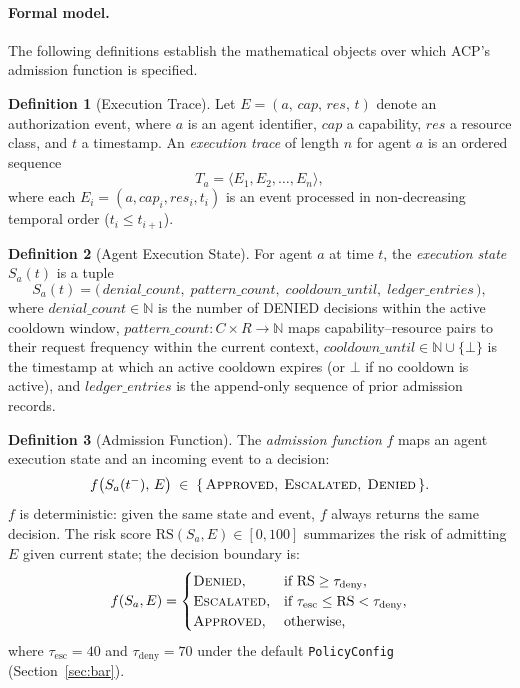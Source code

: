 \documentclass[11pt]{article}
\theoremstyle{definition}
\newtheorem{definition}{Definition}
\begin{document}
\paragraph{Formal model.}
The following definitions establish the mathematical objects over which ACP's
admission function is specified.

\begin{definition}[Execution Trace]
Let $E = (a,\, \mathit{cap},\, \mathit{res},\, t)$ denote an authorization event,
where $a$ is an agent identifier, $\mathit{cap}$ a capability, $\mathit{res}$ a
resource class, and $t$ a timestamp.
An \emph{execution trace} of length $n$ for agent $a$ is an ordered sequence
\[
  T_a = \langle E_1, E_2, \dots, E_n \rangle,
\]
where each $E_i = (a, \mathit{cap}_i, \mathit{res}_i, t_i)$ is an event
processed in non-decreasing temporal order ($t_i \leq t_{i+1}$).
\end{definition}

\begin{definition}[Agent Execution State]
For agent $a$ at time $t$, the \emph{execution state} $S_a(t)$ is a tuple
\[
  S_a(t) = \bigl(\,\mathit{denial\_count},\; \mathit{pattern\_count},\;
                    \mathit{cooldown\_until},\; \mathit{ledger\_entries}\,\bigr),
\]
where $\mathit{denial\_count} \in \mathbb{N}$ is the number of DENIED decisions
within the active cooldown window, $\mathit{pattern\_count}: C \times R \to \mathbb{N}$
maps capability--resource pairs to their request frequency within the current context,
$\mathit{cooldown\_until} \in \mathbb{N} \cup \{\bot\}$ is the timestamp at which
an active cooldown expires (or $\bot$ if no cooldown is active), and
$\mathit{ledger\_entries}$ is the append-only sequence of prior admission records.
\end{definition}

\begin{definition}[Admission Function]
The \emph{admission function} $f$ maps an agent execution state and an
incoming event to a decision:
\[
  f\bigl(S_a(t^-),\, E\bigr) \;\in\;
  \{\,\textsc{Approved},\; \textsc{Escalated},\; \textsc{Denied}\,\}.
\]
$f$ is deterministic: given the same state and event, $f$ always returns the
same decision.
The risk score $\mathrm{RS}(S_a, E) \in [0, 100]$ summarizes the risk of
admitting $E$ given current state; the decision boundary is:
\[
  f(S_a, E) =
  \begin{cases}
    \textsc{Denied},    & \text{if } \mathrm{RS} \geq \tau_{\mathrm{deny}}, \\
    \textsc{Escalated}, & \text{if } \tau_{\mathrm{esc}} \leq \mathrm{RS} < \tau_{\mathrm{deny}}, \\
    \textsc{Approved},  & \text{otherwise,}
  \end{cases}
\]
where $\tau_{\mathrm{esc}} = 40$ and $\tau_{\mathrm{deny}} = 70$ under the
default \texttt{PolicyConfig} (Section~\ref{sec:bar}).
\end{definition}
\end{document}
